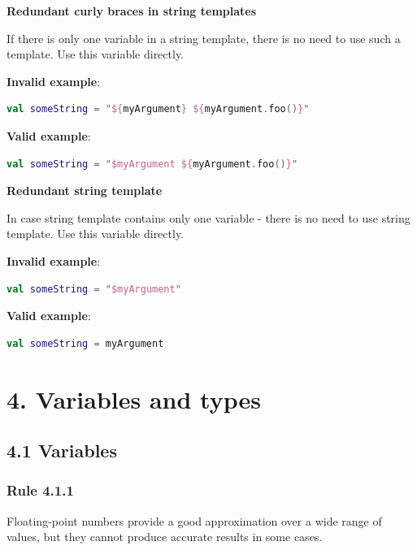 {{{{\textbf{Redundant curly braces in string templates}



If there is only one variable in a string template, there is no need to use such a template. Use this variable directly.

\textbf{Invalid example}:

\begin{lstlisting}[language=Kotlin]
val someString = "${myArgument} ${myArgument.foo()}"
\end{lstlisting}


\textbf{Valid example}:

\begin{lstlisting}[language=Kotlin]
val someString = "$myArgument ${myArgument.foo()}"
\end{lstlisting}


\textbf{Redundant string template}



In case string template contains only one variable - there is no need to use string template. Use this variable directly.



\textbf{Invalid example}:

\begin{lstlisting}[language=Kotlin]
val someString = "$myArgument"
\end{lstlisting}


\textbf{Valid example}:

\begin{lstlisting}[language=Kotlin]
val someString = myArgument
\end{lstlisting}
\section*{\textbf{4. Variables and types}}

\subsection*{\textbf{4.1 Variables}}

\subsubsection*{\textbf{Rule 4.1.1}}
\leavevmode\newline

Floating-point numbers provide a good approximation over a wide range of values, but they cannot produce accurate results in some cases.

}}}}
